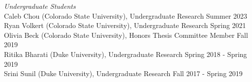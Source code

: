\documentclass[margin,line]{res}
\begin{document}
\begin{resume}
\vspace{-.3cm}
{\em Undergraduate Students} \hfill \\
Caleb Chou (Colorado State University), Undergraduate Research \hfill Summer 2023 \\
Ryan Volkert (Colorado State University), Undergraduate Research \hfill Spring 2021 \\
Olivia Beck (Colorado State University), Honors Thesis Committee Member \hfill Fall 2019 \\
Ritika Bharati (Duke University), Undergraduate Research \hfill Spring 2018 - Spring 2019\\
Srini Sunil (Duke University), Undergraduate Research \hfill Fall 2017 - Spring 2019


\end{resume}
\end{document}
